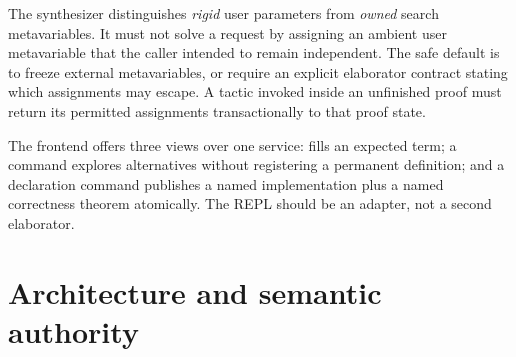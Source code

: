 The synthesizer distinguishes \emph{rigid} user parameters from \emph{owned} search metavariables. It must not solve a request by assigning an ambient user metavariable that the caller intended to remain independent. The safe default is to freeze external metavariables, or require an explicit elaborator contract stating which assignments may escape. A tactic invoked inside an unfinished proof must return its permitted assignments transactionally to that proof state.

The frontend offers three views over one service:  fills an expected term; a  command explores alternatives without registering a permanent definition; and a declaration command publishes a named implementation plus a named correctness theorem atomically. The REPL should be an adapter, not a second elaborator.

\section{Architecture and semantic authority}
\label{sec:architecture}

